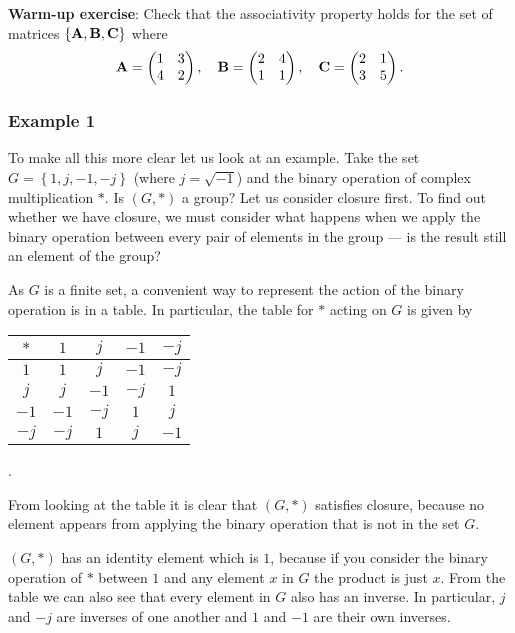 {\bf Warm-up exercise}: Check that the associativity property holds for the set of matrices $\left\{{\bf A},{\bf B},{\bf C}\right\}$ where
\begin{equation*}
 {\bf A}=\begin{pmatrix}
  1 & 3 \\
  4 & 2
 \end{pmatrix}, \hspace{10pt}
  {\bf B}=\begin{pmatrix}
  2 & 4 \\
  1 & 1
 \end{pmatrix}
 , \hspace{10pt}
  {\bf C}=\begin{pmatrix}
  2 & 1 \\
  3 & 5
 \end{pmatrix}.
\end{equation*}

\subsubsection*{Example 1}
To make all this more clear let us look at an example. Take the set $G=\left\{ 1,j,-1,-j \right\}$ (where $j=\sqrt{-1}$) and the binary operation of complex multiplication $*$. Is $(G,*)$ a group? Let us consider closure first. To find out whether we have closure, we must consider what happens when we apply the binary operation between every pair of elements in the group --- is the result still an element of the group? 

As $G$ is a finite set, a convenient way to represent the action of the binary operation is in a table. In particular, the table for $*$ acting on $G$ is given by
\begin{center}
\begin{tabular}{c|cccc}
$*$ & $1$ & $j$ & $-1$ & $-j$  \\ \hline
$1$ & $1$ & $j$ & $-1$ & $-j$  \\
$j$ & $j$ & $-1$ & $-j$ & $1$ \\
$-1$ & $-1$ & $-j$ & $1$ & $j$ \\
$-j$ & $-j$ & $1$ & $j$ & $-1$ 
\end{tabular}.
\end{center}
From looking at the table it is clear that $(G,*)$ satisfies closure, because no element appears from applying the binary operation that is not in the set $G$. 

 $(G,*)$ has an identity element which is $1$, because if you consider the binary operation of $*$ between $1$ and any element $x$ in $G$ the product is just $x$. From the table we can also see that every element in $G$ also has an inverse. In particular, $j$ and $-j$ are inverses of one another and $1$ and $-1$ are their own inverses.

